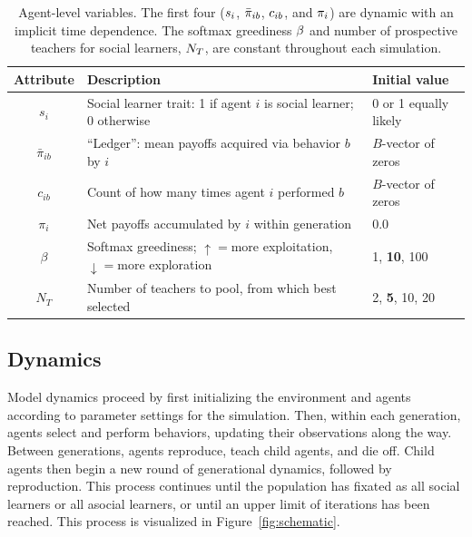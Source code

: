 \documentclass[letterpaper,11.5pt]{scrartcl}
\begin{document}
\begin{table}[h]
  \vspace{2em}
  \caption{Agent-level variables. The first four ($\protect s_i$, $\protect
    \bar\pi_{ib}$, $\protect c_{ib}$,
  and $\protect \pi_i$) are dynamic with an implicit time dependence. The softmax
greediness $\protect \beta$ and number of prospective teachers for social learners,
$\protect N_T$, are constant throughout each simulation.}
    \label{tab:modelParameters}
    \centering %
    \begin{tabular}{cp{4.0in}p{1.25in}} \toprule

        Attribute & Description & Initial value \\ 

        \midrule  

        $s_i$  & Social learner trait: 1 if agent $i$ is social learner; 0 otherwise & 0
        or 1 equally likely \\

        $\bar\pi_{ib}$ & ``Ledger'': mean payoffs acquired via behavior $b$ by $i$ 
                       & $B$-vector of zeros \\

        $c_{ib}$ & Count of how many times agent $i$ performed $b$ 
              & $B$-vector of zeros \\

        $\pi_i$ & Net payoffs accumulated by $i$ within generation & 0.0 \\

        $\beta$ & Softmax greediness; $\uparrow=$more exploitation, $\downarrow=$more
                    exploration 
               & 1, \textbf{10}, 100 \\
        
        $N_T$    & Number of teachers to pool, from which best selected 
                 & 2, \textbf{5}, 10, 20  \\

        \bottomrule
    \end{tabular}
\end{table}



\subsection{Dynamics}

Model dynamics proceed by first initializing the environment and agents according
to parameter settings for the simulation. Then, within each generation,
agents select and perform behaviors, updating their observations along the way.
Between generations, agents reproduce, teach child agents, and die off. 
Child agents then begin a new round of generational dynamics, followed by
reproduction. This process continues until the population has fixated as
all social learners or all asocial learners, or until an upper limit of 
iterations has been reached. This process is visualized in
Figure~\ref{fig:schematic}.
\end{document}
